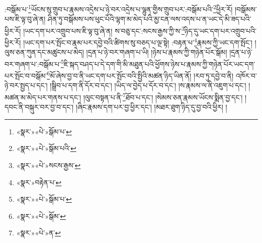 :བསྒོམ་པ་\footnote{«སྣར་»«པེ་»སྒོམ་པ་}ཡོངས་སུ་གྲུབ་པ་རྣམས་འདྲེས་པ་ཉེ་བར་འདྲེས་པ་ལྷུན་གྱིས་གྲུབ་པར་:བསྒོམ་པའི་\footnote{«སྣར་»«པེ་»སྒོམ་པའི་}ཕྱིར་རོ། །བསྒོམས་པས་ཇི་ལྟ་བུ་ཞེ་ན། ཤིན་ཏུ་བསྒོམས་པས་ཕུང་པོའི་ལྷག་མ་མེད་པའི་མྱ་ངན་ལས་འདས་པ་ན་ཡང་དེ་མི་ཟད་པའི་ཕྱིར་རོ། །ཡང་དག་པར་འགྲུབ་པས་ཇི་ལྟ་བུ་ཞེ་ན། ས་བཅུ་དང་:སངས་རྒྱས་ཀྱི་ས་\footnote{«སྣར་»«པེ་»སངས་རྒྱས་}ཉིད་དུ་ཡང་དག་པར་འགྲུབ་པའི་ཕྱིར་རོ། །ཡང་དག་པར་སྤོང་བ་རྣམ་པར་དབྱེ་བའི་ཚིགས་སུ་བཅད་པ་ལྔ་སྟེ། :བརྟན་པ་\footnote{«སྣར་»བརྟེན་པ་}རྣམས་ཀྱི་ཡང་དག་སྤོང་། །ལུས་ཅན་ཀུན་དང་མཚུངས་པ་མེད། །དྲན་པ་ཉེ་བར་གཞག་པ་ཡི། །ཉེས་པ་རྣམས་ཀྱི་གཉེན་པོར་སྒོམ། །དྲན་པ་ཉེ་བར་གཞག་པ་:བསྒོམ་པ་\footnote{«སྣར་»«པེ་»སྒོམ་པ་}ཇི་སྐད་བཤད་པ་དེ་དག་གི་མི་མཐུན་པའི་ཕྱོགས་ཉེས་པ་རྣམས་ཀྱི་གཉེན་པོར་ཡང་དག་པར་སྤོང་བ་བསྒོམ་\footnote{«སྣར་»«པེ་»སྒོམ་}མོ་ཞེས་བྱ་བ་ནི་ཡང་དག་པར་སྤོང་བའི་སྤྱིའི་མཚན་ཉིད་ཡིན་ནོ། །རབ་ཏུ་དབྱེ་བ་ནི། འཁོར་བ་ཉེ་བར་སྤྱད་པ་དང་། །སྒྲིབ་པ་དག་ནི་དོར་བ་དང་། །ཡིད་ལ་བྱེད་པ་དོར་བ་དང་། །ས་རྣམས་ལ་ནི་འཇུག་པ་དང་། །མཚན་མ་མེད་པར་གནས་པ་དང་། །ལུང་བསྟན་པ་ནི་\footnote{«སྣར་»«པེ་»ན་}ཐོབ་པ་དང་། །སེམས་ཅན་རྣམས་ཡོངས་སྨིན་བྱ་དང་། །དབང་ནི་བསྐུར་བར་བྱ་བ་དང་། །ཞིང་རྣམས་དག་པར་བྱ་ཕྱིར་དང་། །མཐར་ཐུག་ཉིད་དུ་བྱ་བའི་ཕྱིར། །
